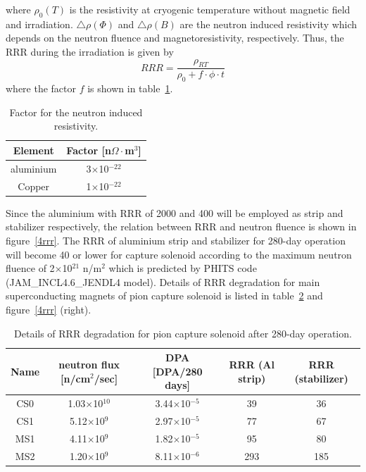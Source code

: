 where $\rho_0(T)$ is the resistivity at cryogenic temperature without magnetic field and irradiation.
$\bigtriangleup \rho(\Phi)$ and $\bigtriangleup \rho(B)$ are the neutron induced resistivity which depends on the neutron fluence and magnetoresistivity, respectively.
Thus, the RRR during the irradiation is given by
\begin{equation}
 RRR = \frac{\rho_{RT}}{\rho_0 + f \cdot \phi \cdot t}
\end{equation}
where the factor $f$ is shown in table~\ref{factorirr}.
\begin{table}[H]
 \centering
 \begin{tabular}{cc} \hline \hline
  Element & Factor [n$\Omega\cdot$m$^3$] \\ \hline
  aluminium & 3$\times$10$^{-22}$ \\
  Copper & 1$\times$10$^{-22}$ \\ \hline \hline
 \end{tabular}
 \caption{Factor for the neutron induced resistivity.}
 \label{factorirr}
\end{table}
Since the aluminium with RRR of 2000 and 400 will be employed as strip and stabilizer respectively, the relation between RRR and neutron fluence is shown in figure~\ref{4rrr}.
The RRR of aluminium strip and stabilizer for 280-day operation will become 40 or lower for capture solenoid according to the maximum neutron fluence of 2$\times$10$^{21}$ n/m$^2$ which is predicted by PHITS code (JAM\_INCL4.6\_JENDL4 model).
Details of RRR degradation for main superconducting magnets of pion capture solenoid is listed in table~\ref{RRRdeg} and figure~\ref{4rrr} (right).
\begin{table}[H]
 \centering
 \begin{tabular}{ccccc} \hline \hline
  Name & neutron flux [n/cm$^2$/sec] & DPA [DPA/280 days] & RRR (Al strip) & RRR (stabilizer) \\ \hline
  CS0 & 1.03$\times$10$^{10}$ & 3.44$\times$10$^{-5}$ & 39 & 36 \\
  CS1 & 5.12$\times$10$^{9}$ & 2.97$\times$10$^{-5}$ & 77 & 67 \\
  MS1 & 4.11$\times$10$^{9}$ & 1.82$\times$10$^{-5}$ & 95 & 80 \\
  MS2 & 1.20$\times$10$^{9}$ & 8.11$\times$10$^{-6}$ & 293 & 185 \\ \hline \hline
 \end{tabular}
 \caption{Details of RRR degradation for pion capture solenoid after 280-day operation.}
 \label{RRRdeg}
\end{table}

